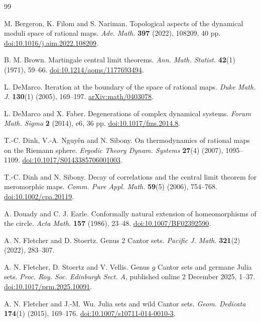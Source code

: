 \documentclass[11pt,reqno]{amsart}
\theoremstyle{plain}
\theoremstyle{definition}
\theoremstyle{remark}
\numberwithin{equation}{section}
\begin{document}
\begin{thebibliography}{99}

M. Bergeron, K. Filom and S. Nariman. Topological aspects of the dynamical moduli space of rational maps.
\emph{Adv. Math.} \textbf{397} (2022), 108209, 40 pp.
\href{https://doi.org/10.1016/j.aim.2022.108209}{doi:10.1016/j.aim.2022.108209}.

B. M. Brown. Martingale central limit theorems.
\emph{Ann. Math. Statist.} \textbf{42}(1) (1971), 59--66.
\href{https://doi.org/10.1214/aoms/1177693494}{doi:10.1214/aoms/1177693494}.

L. DeMarco. Iteration at the boundary of the space of rational maps.
\emph{Duke Math. J.} \textbf{130}(1) (2005), 169--197.
\href{https://arxiv.org/abs/math/0403078}{arXiv:math/0403078}.

L. DeMarco and X. Faber. Degenerations of complex dynamical systems.
\emph{Forum Math. Sigma} \textbf{2} (2014), e6, 36 pp.
\href{https://doi.org/10.1017/fms.2014.8}{doi:10.1017/fms.2014.8}.

T.-C. Dinh, V.-A. Nguy\^en and N. Sibony. On thermodynamics of rational maps on the Riemann sphere.
\emph{Ergodic Theory Dynam. Systems} \textbf{27}(4) (2007), 1095--1109.
\href{https://doi.org/10.1017/S0143385706001003}{doi:10.1017/S0143385706001003}.

T.-C. Dinh and N. Sibony. Decay of correlations and the central limit theorem for meromorphic maps.
\emph{Comm. Pure Appl. Math.} \textbf{59}(5) (2006), 754--768.
\href{https://doi.org/10.1002/cpa.20119}{doi:10.1002/cpa.20119}.

A. Douady and C. J. Earle. Conformally natural extension of homeomorphisms of the circle.
\emph{Acta Math.} \textbf{157} (1986), 23--48.
\href{https://doi.org/10.1007/BF02392590}{doi:10.1007/BF02392590}.

A. N. Fletcher and D. Stoertz. Genus 2 Cantor sets.
\emph{Pacific J. Math.} \textbf{321}(2) (2022), 283--307.

A. N. Fletcher, D. Stoertz and V. Vellis. Genus $g$ Cantor sets and germane Julia sets.
\emph{Proc. Roy. Soc. Edinburgh Sect. A}, published online 2 December 2025, 1--37.
\href{https://doi.org/10.1017/prm.2025.10091}{doi:10.1017/prm.2025.10091}.

A. N. Fletcher and J.-M. Wu. Julia sets and wild Cantor sets.
\emph{Geom. Dedicata} \textbf{174}(1) (2015), 169--176.
\href{https://doi.org/10.1007/s10711-014-0010-3}{doi:10.1007/s10711-014-0010-3}.


\end{thebibliography}
\end{document}
